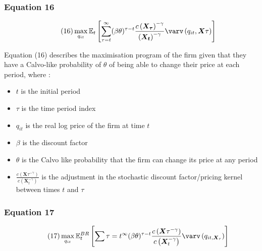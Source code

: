 \documentclass{article}
\begin{document}
\subsubsection*{Equation 16}
\begin{equation}\tag{16}
    \max_{q_{it}} \mathbb{E}_{t}\left[\sum_{\tau=t}^{\infty}(\beta\theta)^{\tau-t} \frac{c\left(\bm{X_{\tau}}\right)^{-\gamma}}{\left(\bm{X_{t}}\right)^{-\gamma}} \varv\left(q_{it},\bm{X}{\tau}\right)\right]
\end{equation}

Equation (16) describes the maximisation program of the firm given that they have a Calvo-like probability of $\theta$ of being able to change their price at each period, where : 

\begin{itemize}
    \item $t$ is the initial period 
    \item $\tau$ is the time period index  
    \item $q_{it}$ is the real log price of the firm at time $t$
    \item $\beta$ is the discount factor
    \item $\theta$ is the Calvo like probability that the firm can change its price at any period
    \item $\frac{c\left(\bm{X}{\tau}^{-\gamma}\right)}{c\left(\bm{X}_{t}^{-\gamma}\right)}$ is the adjustment in the stochastic discount factor/pricing kernel between times $t$ and $\tau$ 
\end{itemize}

\subsubsection*{Equation 17}
\begin{equation}\tag{17}
    \max_{q_{it}}{\mathbb{E}_{t}^{BR} \left[\sum{\tau=t}^{\infty}(\beta\theta)^{\tau-t}\frac{c\left(\bm{X}{\tau}^{-\gamma}\right)}{c\left(\bm{X}_{t}^{-\gamma}\right)} \varv\left(q_{it,\bm{X}_{\tau}}\right) \right]}
\end{equation}
\end{document}
